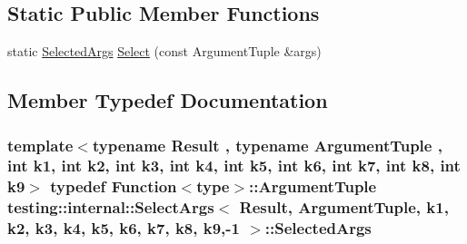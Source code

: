 \subsection*{Static Public Member Functions}
\begin{DoxyCompactItemize}
\item 
static \hyperlink{classtesting_1_1internal_1_1_select_args_3_01_result_00_01_argument_tuple_00_01k1_00_01k2_00_01kbad6295bde1bc89afd5e3dfe4d52ae94_a620901c52dc62d8ab6ca88625cb63dc5}{Selected\+Args} \hyperlink{classtesting_1_1internal_1_1_select_args_3_01_result_00_01_argument_tuple_00_01k1_00_01k2_00_01kbad6295bde1bc89afd5e3dfe4d52ae94_abc43659bbcddb9e05c2f947d20a68706}{Select} (const Argument\+Tuple \&args)
\end{DoxyCompactItemize}


\subsection{Member Typedef Documentation}
\subsubsection[{\texorpdfstring{Selected\+Args}{SelectedArgs}}]{\setlength{\rightskip}{0pt plus 5cm}template$<$typename Result , typename Argument\+Tuple , int k1, int k2, int k3, int k4, int k5, int k6, int k7, int k8, int k9$>$ typedef {\bf Function}$<${\bf type}$>$\+::Argument\+Tuple {\bf testing\+::internal\+::\+Select\+Args}$<$ Result, Argument\+Tuple, k1, k2, k3, k4, k5, k6, k7, k8, k9,-\/1 $>$\+::{\bf Selected\+Args}}\hypertarget{classtesting_1_1internal_1_1_select_args_3_01_result_00_01_argument_tuple_00_01k1_00_01k2_00_01kbad6295bde1bc89afd5e3dfe4d52ae94_a620901c52dc62d8ab6ca88625cb63dc5}{}\label{classtesting_1_1internal_1_1_select_args_3_01_result_00_01_argument_tuple_00_01k1_00_01k2_00_01kbad6295bde1bc89afd5e3dfe4d52ae94_a620901c52dc62d8ab6ca88625cb63dc5}
